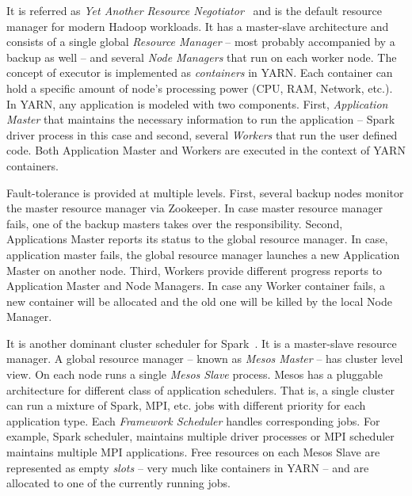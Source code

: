 \begin{description}[leftmargin=0pt]
    \item [Apache YARN] It is referred as \emph{Yet Another Resource Negotiator}~\cite{Vavilapalli:2013} and is the default resource manager for modern Hadoop workloads. It has a master-slave architecture and consists of a single global \emph{Resource Manager} -- most probably accompanied by a backup as well --  and several \emph{Node Managers} that run on each worker node. The concept of executor is implemented as \emph{containers} in YARN. Each container can hold a specific amount of node's processing power (CPU, RAM, Network, etc.). In YARN, any application is modeled with two components. First, \emph{Application Master} that maintains the necessary information to run the application -- Spark driver process in this case and second, several \emph{Workers} that run the user defined code. Both Application Master and Workers are executed in the context of YARN containers. 
    
    Fault-tolerance is provided at multiple levels. First, several backup nodes monitor the master resource manager via Zookeeper. In case master resource manager fails, one of the backup masters takes over the responsibility. Second, Applications Master reports its status to the global resource manager. In case, application master fails, the global resource manager launches a new Application Master on another node. Third, Workers provide different progress reports to Application Master and Node Managers. In case any Worker container fails, a new container will be allocated and the old one will be killed by the local Node Manager.
    \item [Apache Mesos] It is another dominant cluster scheduler for Spark~\cite{Hindman:2011}. It is a master-slave resource manager. A global resource manager -- known as \emph{Mesos Master} -- has cluster level view. On each node runs a single \emph{Mesos Slave} process. Mesos has a pluggable architecture for different class of application schedulers. That is, a single cluster can run a mixture of Spark, MPI, etc. jobs with different priority for each application type. Each \emph{Framework Scheduler} handles corresponding jobs. For example, Spark scheduler, maintains multiple driver processes or MPI scheduler maintains multiple MPI applications. Free resources on each Mesos Slave are represented as empty \emph{slots} -- very much like containers in YARN -- and are allocated to one of the currently running jobs.
    

\end{description}
